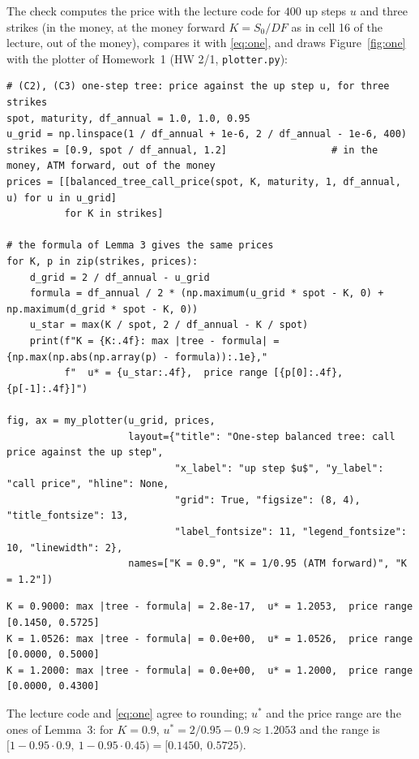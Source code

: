 \documentclass[11pt,a4paper]{article}
\begin{document}
\noindent The check computes the price with the lecture code for $400$ up steps $u$ and three strikes (in the money, at the money forward $K=S_0/DF$ as in cell 16 of the lecture, out of the money), compares it with \eqref{eq:one}, and draws Figure~\ref{fig:one} with the plotter of Homework~1 (HW 2/1, \texttt{plotter.py}):
\par\smallskip\noindent\begin{minipage}{\linewidth}\begin{lstlisting}[style=pysmall,title={check of (C2) and (C3), one step}]
# (C2), (C3) one-step tree: price against the up step u, for three strikes
spot, maturity, df_annual = 1.0, 1.0, 0.95
u_grid = np.linspace(1 / df_annual + 1e-6, 2 / df_annual - 1e-6, 400)
strikes = [0.9, spot / df_annual, 1.2]                  # in the money, ATM forward, out of the money
prices = [[balanced_tree_call_price(spot, K, maturity, 1, df_annual, u) for u in u_grid]
          for K in strikes]

# the formula of Lemma 3 gives the same prices
for K, p in zip(strikes, prices):
    d_grid = 2 / df_annual - u_grid
    formula = df_annual / 2 * (np.maximum(u_grid * spot - K, 0) + np.maximum(d_grid * spot - K, 0))
    u_star = max(K / spot, 2 / df_annual - K / spot)
    print(f"K = {K:.4f}: max |tree - formula| = {np.max(np.abs(np.array(p) - formula)):.1e},"
          f"  u* = {u_star:.4f},  price range [{p[0]:.4f}, {p[-1]:.4f}]")

fig, ax = my_plotter(u_grid, prices,
                     layout={"title": "One-step balanced tree: call price against the up step",
                             "x_label": "up step $u$", "y_label": "call price", "hline": None,
                             "grid": True, "figsize": (8, 4), "title_fontsize": 13,
                             "label_fontsize": 11, "legend_fontsize": 10, "linewidth": 2},
                     names=["K = 0.9", "K = 1/0.95 (ATM forward)", "K = 1.2"])
\end{lstlisting}
\begin{lstlisting}[style=out,title={output}]
K = 0.9000: max |tree - formula| = 2.8e-17,  u* = 1.2053,  price range [0.1450, 0.5725]
K = 1.0526: max |tree - formula| = 0.0e+00,  u* = 1.0526,  price range [0.0000, 0.5000]
K = 1.2000: max |tree - formula| = 0.0e+00,  u* = 1.2000,  price range [0.0000, 0.4300]
\end{lstlisting}\end{minipage}\par\smallskip
The lecture code and \eqref{eq:one} agree to rounding; $u^*$ and the price range are the ones of Lemma~3: for $K=0.9$, $u^*=2/0.95-0.9\approx1.2053$ and the range is $[1-0.95\cdot0.9,\ 1-0.95\cdot0.45)=[0.1450,\ 0.5725)$.
\end{document}
